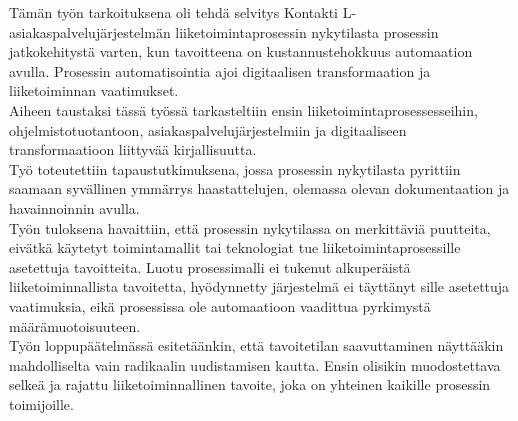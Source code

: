 \documentclass[finnish,12pt,a4paper,pdftex]{article}
\begin{document}
\begin{abstractpage}[finnish]
 
Tämän työn tarkoituksena oli tehdä selvitys Kontakti L-asiakaspalvelujärjestelmän liiketoimintaprosessin nykytilasta prosessin jatkokehitystä varten, kun tavoitteena on kustannustehokkuus automaation avulla. Prosessin automatisointia ajoi digitaalisen transformaation ja liiketoiminnan vaatimukset.\\

Aiheen taustaksi tässä työssä tarkasteltiin ensin liiketoimintaprosessesseihin, ohjelmistotuotantoon, asiakaspalvelujärjestelmiin ja digitaaliseen transformaatioon liittyvää kirjallisuutta.\\

Työ toteutettiin tapaustutkimuksena, jossa prosessin nykytilasta pyrittiin saamaan syvällinen ymmärrys haastattelujen, olemassa olevan dokumentaation ja havainnoinnin avulla. \\

Työn tuloksena havaittiin, että prosessin nykytilassa on merkittäviä puutteita, eivätkä käytetyt toimintamallit tai teknologiat tue liiketoimintaprosessille asetettuja tavoitteita. Luotu prosessimalli ei tukenut alkuperäistä liiketoiminnallista tavoitetta, hyödynnetty järjestelmä ei täyttänyt sille asetettuja vaatimuksia, eikä prosessissa ole automaatioon vaadittua pyrkimystä määrämuotoisuuteen. \\

Työn loppupäätelmässä esitetäänkin, että tavoitetilan saavuttaminen näyttääkin mahdolliselta vain radikaalin uudistamisen kautta. Ensin olisikin muodostettava selkeä ja rajattu liiketoiminnallinen tavoite, joka on yhteinen kaikille prosessin toimijoille. 
\end{abstractpage}
\end{document}
